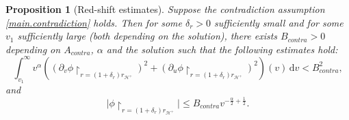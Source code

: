 \documentclass[10pt, reqno]{amsart}
\newtheorem{proposition}[theorem]{Proposition}
\theoremstyle{definition}
\theoremstyle{remark}
\theoremstyle{conjecture}
\numberwithin{equation}{section}
\newcommand{\ud}{\mathrm{d}}
\newcommand{\rd}{\partial}
\newcommand{\0}{\emptyset}
\newcommand{\alp}{\alpha}
\newcommand{\calH}{\mathcal H}
\newcommand{\f}{\frac}
\newcommand{\de}{\delta}
\newcommand{\EH}{\calH^{+}}
\begin{document}
\begin{proposition}[Red-shift estimates]\label{red.shift.prop}
Suppose the contradiction assumption \eqref{main.contradiction} holds. Then for some $\de_r>0$ sufficiently small and for some $v_1$ sufficiently large (both depending on the solution), there exists $B_{contra}>0$ depending on $A_{contra}$, $\alp$ and the solution such that the following estimates hold:
\begin{equation}\label{red.shift.prop.dphi}
\int_{v_1}^\infty v^{\alp}\left((\rd_v\phi\restriction_{r=(1+\de_r)r_{\EH}})^2+(\rd_u\phi\restriction_{r=(1+\de_r)r_{\EH}})^2 \right)(v) \, \ud v <B_{contra}^2,
\end{equation}
and 
\begin{equation}\label{red.shift.prop.phi}
\left|\phi\restriction_{r=(1+\de_r)r_{\EH}}\right|\leq B_{contra} v^{-\f{\alp}{2}+\f 12}.
\end{equation}
\end{proposition}
\end{document}
